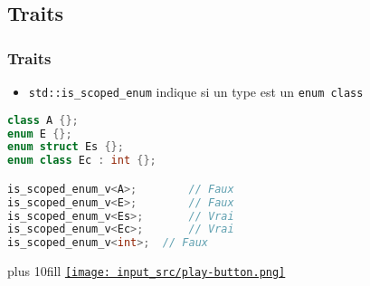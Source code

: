 \documentclass[C++.tex]{subfiles}
\begin{document}
\subsection*{Traits}
\begin{frame}[fragile]
	\frametitle{Traits}
	\begin{itemize}
		\item \lstinline|std::is_scoped_enum| indique si un type est un \lstinline|enum class|
	\end{itemize}

	\begin{lstlisting}[language=C++]
class A {};
enum E {};
enum struct Es {};
enum class Ec : int {};

is_scoped_enum_v<A>;		// Faux
is_scoped_enum_v<E>;		// Faux
is_scoped_enum_v<Es>;		// Vrai
is_scoped_enum_v<Ec>;		// Vrai
is_scoped_enum_v<int>;	// Faux\end{lstlisting}

	\vskip 10mm plus 10fill
	\hfill
	\href{https://godbolt.org/#g:!((g:!((g:!((h:codeEditor,i:(filename:'1',fontScale:14,fontUsePx:'0',j:1,lang:c%2B%2B,selection:(endColumn:1,endLineNumber:29,positionColumn:1,positionLineNumber:29,selectionStartColumn:1,selectionStartLineNumber:1,startColumn:1,startLineNumber:1),source:'%23include+%3Ciostream%3E%0A%23include+%3Ctype_traits%3E%0A%0Aclass+A%0A%7B%0A%7D%3B%0A%0Aenum+E%0A%7B%0A%7D%3B%0A%0Aenum+struct+Es+%0A%7B%0A%7D%3B%0A%0Aenum+class+Ec+:+int+%0A%7B%0A%7D%3B%0A%0Aint+main()%0A%7B%0A++std::cout+%3C%3C+std::boolalpha%3B%0A++std::cout+%3C%3C+std::is_scoped_enum_v%3CA%3E+%3C%3C+%22%5Cn%22%3B%0A++std::cout+%3C%3C+std::is_scoped_enum_v%3CE%3E+%3C%3C+%22%5Cn%22%3B%0A++std::cout+%3C%3C+std::is_scoped_enum_v%3CEs%3E+%3C%3C+%22%5Cn%22%3B%0A++std::cout+%3C%3C+std::is_scoped_enum_v%3CEc%3E+%3C%3C+%22%5Cn%22%3B%0A++std::cout+%3C%3C+std::is_scoped_enum_v%3Cint%3E+%3C%3C+%22%5Cn%22%3B%0A%7D%0A'),l:'5',n:'0',o:'C%2B%2B+source+%231',t:'0')),k:50,l:'4',n:'0',o:'',s:0,t:'0'),(g:!((h:executor,i:(argsPanelShown:'1',compilationPanelShown:'0',compiler:g122,compilerName:'',compilerOutShown:'0',execArgs:'',execStdin:'',fontScale:14,fontUsePx:'0',j:1,lang:c%2B%2B,libs:!((name:boost,ver:'175')),options:'-std%3Dc%2B%2B23+-Wall+-Wextra+-pedantic',source:1,stdinPanelShown:'1',tree:'1',wrap:'0'),l:'5',n:'0',o:'Executor+x86-64+gcc+12.2+(C%2B%2B,+Editor+%231)',t:'0')),header:(),k:50,l:'4',n:'0',o:'',s:0,t:'0')),l:'2',n:'0',o:'',t:'0')),version:4}{\texttt{[image: input\_src/play-button.png]}}
\end{frame}
\end{document}
